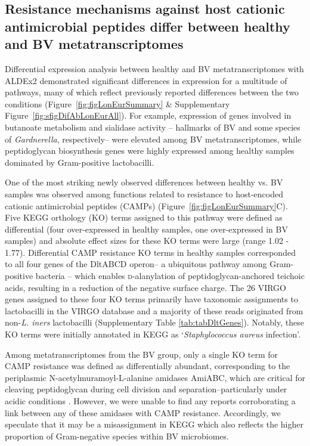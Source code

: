 \documentclass[sn-mathphys,Numbered]{sn-jnl}%
\begin{document}
\subsection{Resistance mechanisms against host cationic antimicrobial peptides differ between healthy and BV metatranscriptomes} \label{subsec:subsecCAMPs}

Differential expression analysis between healthy and BV metatranscriptomes with ALDEx2 demonstrated significant differences in expression for a multitude of pathways, many of which reflect previously reported differences between the two conditions (Figure~\ref{fig:figLonEurSummary} \& Supplementary Figure~\ref{fig:sfigDifAbLonEurAll}). For example, expression of genes involved in butanoate metabolism \citep{yeoman_multi-omic_2013} and sialidase activity \citep{hardy_presence_2017-1}-- hallmarks of BV and some species of \textit{Gardnerella}, respectively-- were elevated among BV metatranscriptomes, while peptidoglycan biosynthesis genes were highly expressed among healthy samples dominated by Gram-positive lactobacilli.

One of the most striking newly observed differences between healthy vs. BV samples was observed among functions related to resistance to host-encoded cationic antimicrobial peptides (CAMPs) (Figure~\ref{fig:figLonEurSummary}C). Five KEGG orthology (KO) terms assigned to this pathway were defined as differential (four over-expressed in healthy samples, one over-expressed in BV samples) and absolute effect sizes for these KO terms were large (range 1.02 - 1.77). Differential CAMP resistance KO terms in healthy samples corresponded to all four genes of the DltABCD operon-- a ubiquitous pathway among Gram-positive bacteria \citep{neuhaus_continuum_2003}-- which enables \textsc{d}-alanylation of peptidoglycan-anchored teichoic acids, resulting in a reduction of the negative surface charge. The 26 VIRGO genes assigned to these four KO terms primarily have taxonomic assignments to lactobacilli in the VIRGO database and a majority of these reads originated from non-\textit{L. iners} lactobacilli (Supplementary Table \ref{tab:tabDltGenes}). Notably, these KO terms were initially annotated in KEGG as `\textit{Staphylococcus aureus} infection'.

Among metatranscriptomes from the BV group, only a single KO term for CAMP resistance was defined as differentially abundant, corresponding to the periplasmic N-acetylmuramoyl-L-alanine amidases AmiABC, which are critical for cleaving peptidoglycan during cell division and separation--particularly under acidic conditions \citep{mueller_active_2021}. However, we were unable to find any reports corroborating a link between any of these amidases with CAMP resistance. Accordingly, we speculate that it may be a misassignment in KEGG which also reflects the higher proportion of Gram-negative species within BV microbiomes.
\end{document}
